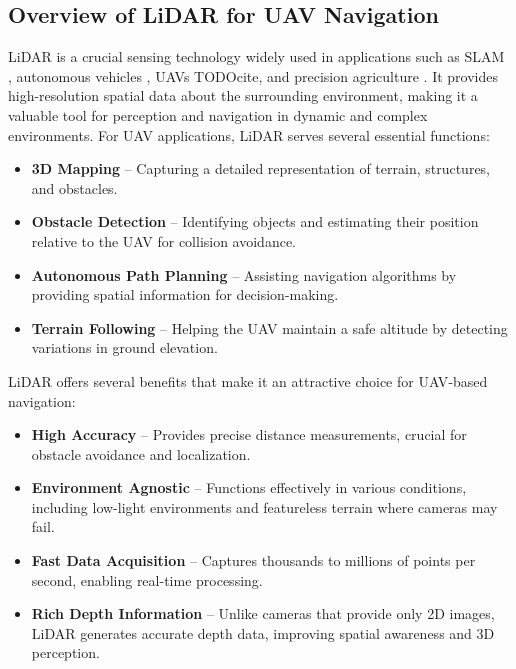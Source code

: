         \subsection{Overview of LiDAR for UAV Navigation}
            \ac{LiDAR} is a crucial sensing technology widely used in applications such as SLAM \cite{pointlio_mrs}, autonomous vehicles \cite{Lidar_autonomous_vehicles}, UAVs TODOcite, and precision agriculture \cite{Lidar_agriculture}. 
            It provides high-resolution spatial data about the surrounding environment, making it a valuable tool for perception and navigation in dynamic and complex environments.  
            For UAV applications, \ac{LiDAR} serves several essential functions:  
            \begin{itemize}  
                \item \textbf{3D Mapping} -- Capturing a detailed representation of terrain, structures, and obstacles.  
                \item \textbf{Obstacle Detection} -- Identifying objects and estimating their position relative to the \ac{UAV} for collision avoidance.  
                \item \textbf{Autonomous Path Planning} -- Assisting navigation algorithms by providing spatial information for decision-making.  
                \item \textbf{Terrain Following} -- Helping the \ac{UAV} maintain a safe altitude by detecting variations in ground elevation.  
            \end{itemize}  

            \ac{LiDAR} offers several benefits that make it an attractive choice for \ac{UAV}-based navigation:  
            \begin{itemize}  
                \item \textbf{High Accuracy} -- Provides precise distance measurements, crucial for obstacle avoidance and localization.  
                \item \textbf{Environment Agnostic} -- Functions effectively in various conditions, including low-light environments and featureless terrain where cameras may fail.  
                \item \textbf{Fast Data Acquisition} -- Captures thousands to millions of points per second, enabling real-time processing.  
                \item \textbf{Rich Depth Information} -- Unlike cameras that provide only 2D images, \ac{LiDAR} generates accurate depth data, improving spatial awareness and 3D perception.  
            \end{itemize}  

